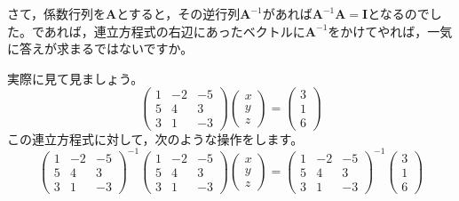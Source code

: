 \documentclass{ltjsbook}
\begin{document}
さて，係数行列を$\bm{A}$とすると，その逆行列$\bm{A}^{-1}$があれば$\bm{A}^{-1}\bm{A} = \bm{I}$となるのでした。であれば，連立方程式の右辺にあったベクトルに$\bm{A}^{-1}$をかけてやれば，一気に答えが求まるではないですか。

実際に見て見ましょう。
\[
	\begin{pmatrix} 1 & -2 & -5 \\
                5 & 4  & 3  \\
                3 & 1  & -3\end{pmatrix}
	\begin{pmatrix} x \\ y \\ z \end{pmatrix}
	=
	\begin{pmatrix} 3 \\ 1 \\ 6 \end{pmatrix}
\]
この連立方程式に対して，次のような操作をします。
\[
	\begin{pmatrix} 1 & -2 & -5 \\
                5 & 4  & 3  \\
                3 & 1  & -3\end{pmatrix}^{-1}
	\begin{pmatrix} 1 & -2 & -5 \\
                5 & 4  & 3  \\
                3 & 1  & -3\end{pmatrix}
	\begin{pmatrix} x \\ y \\ z \end{pmatrix}
	=
	\begin{pmatrix} 1 & -2 & -5 \\
                5 & 4  & 3  \\
                3 & 1  & -3\end{pmatrix}^{-1}
	\begin{pmatrix} 3 \\ 1 \\ 6 \end{pmatrix}
\]
\end{document}

